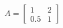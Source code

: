 \documentclass[preview]{standalone}
\begin{document}
\begin{align*}
A=\begin{bmatrix}1&2\\0.5&1\end{bmatrix}
\end{align*}
\end{document}
